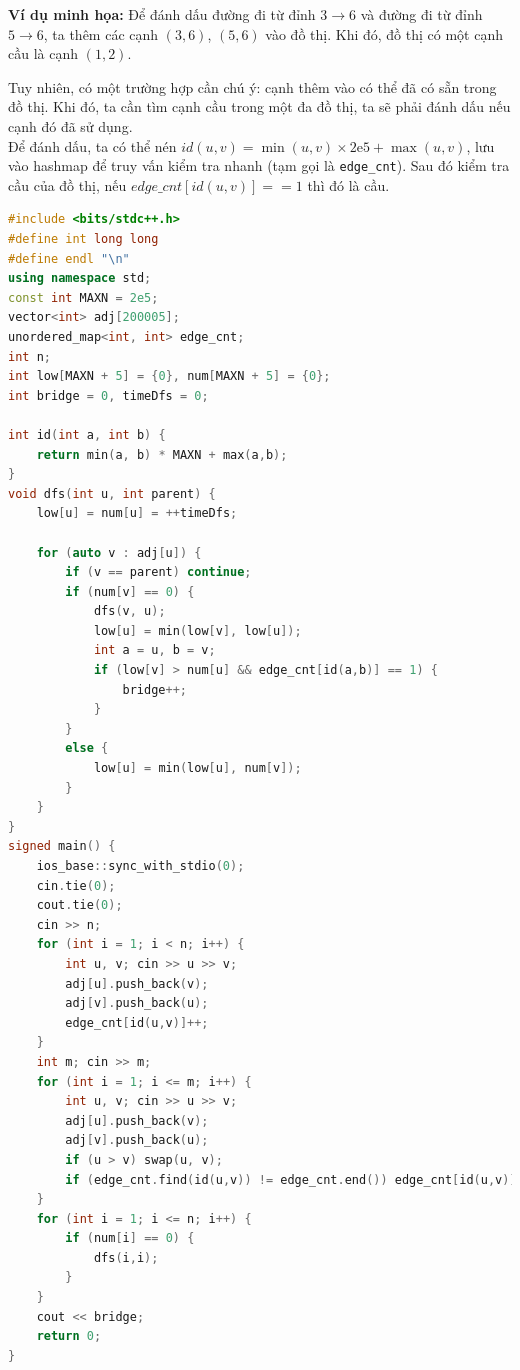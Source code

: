 \documentclass{article}
\begin{document}
\textbf{Ví dụ minh họa:} Để đánh dấu đường đi từ đỉnh $3 \rightarrow 6$ và đường đi từ đỉnh $5 \rightarrow 6$, ta thêm các cạnh $(3, 6)$, $(5, 6)$ vào đồ thị. Khi đó, đồ thị có một cạnh cầu là cạnh $(1, 2)$.

\begin{center}
\end{center}

Tuy nhiên, có một trường hợp cần chú ý: cạnh thêm vào có thể đã có sẵn trong đồ thị. Khi đó, ta cần tìm cạnh cầu trong một đa đồ thị, ta sẽ phải đánh dấu nếu cạnh đó đã sử dụng. \\

Để đánh dấu, ta có thể nén $id(u, v) = \min(u, v) \times 2\mathrm{e}5 + \max(u, v)$, lưu vào hashmap để truy vấn kiểm tra nhanh (tạm gọi là \texttt{edge\_cnt}). Sau đó kiểm tra cầu của đồ thị, nếu $edge\_cnt[id(u, v)] == 1$ thì đó là cầu.

\begin{lstlisting}[language=C++, caption={Cài đặt}]
#include <bits/stdc++.h>
#define int long long
#define endl "\n"
using namespace std;
const int MAXN = 2e5;
vector<int> adj[200005];
unordered_map<int, int> edge_cnt;
int n;
int low[MAXN + 5] = {0}, num[MAXN + 5] = {0};
int bridge = 0, timeDfs = 0;

int id(int a, int b) {
    return min(a, b) * MAXN + max(a,b);
}
void dfs(int u, int parent) {
    low[u] = num[u] = ++timeDfs;

    for (auto v : adj[u]) {
        if (v == parent) continue;
        if (num[v] == 0) {
            dfs(v, u);
            low[u] = min(low[v], low[u]);
            int a = u, b = v;
            if (low[v] > num[u] && edge_cnt[id(a,b)] == 1) {
                bridge++;
            }
        }
        else {
            low[u] = min(low[u], num[v]);
        }
    }
}
signed main() {
    ios_base::sync_with_stdio(0);
    cin.tie(0);
    cout.tie(0);
    cin >> n;
    for (int i = 1; i < n; i++) {
        int u, v; cin >> u >> v;
        adj[u].push_back(v);
        adj[v].push_back(u);
        edge_cnt[id(u,v)]++;
    }
    int m; cin >> m;
    for (int i = 1; i <= m; i++) {
        int u, v; cin >> u >> v;
        adj[u].push_back(v);
        adj[v].push_back(u);
        if (u > v) swap(u, v);
        if (edge_cnt.find(id(u,v)) != edge_cnt.end()) edge_cnt[id(u,v)]++;
    }
    for (int i = 1; i <= n; i++) {
        if (num[i] == 0) {
            dfs(i,i);
        }
    }
    cout << bridge;
    return 0;
}
\end{lstlisting}
\end{document}
